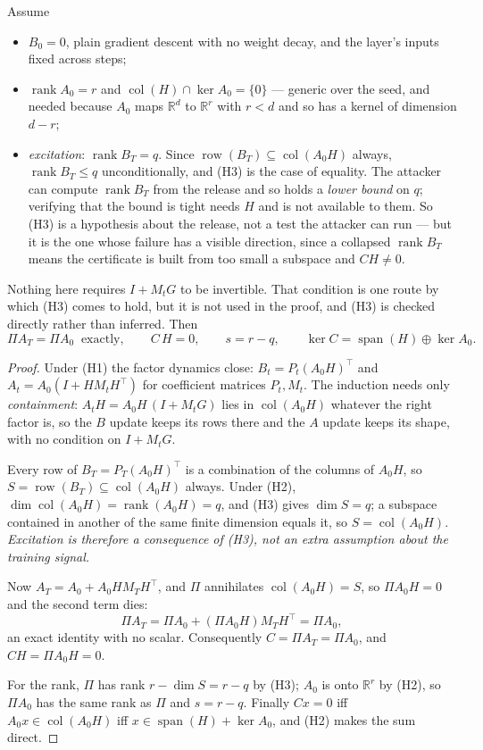 \begin{theorem}\label{thm:cert}
Assume
\begin{itemize}
\item[(H1)] $B_0=0$, plain gradient descent with no weight decay, and the layer's inputs fixed
  across steps;
\item[(H2)] $\operatorname{rank}A_0=r$ and $\operatorname{col}(H)\cap\ker A_0=\{0\}$ --- generic
  over the seed, and needed because $A_0$ maps $\mathbb R^{d}$ to $\mathbb R^{r}$ with $r<d$ and so
  has a kernel of dimension $d-r$;
\item[(H3)] \emph{excitation}: $\operatorname{rank}B_T=q$. Since
  $\operatorname{row}(B_T)\subseteq\operatorname{col}(A_0H)$ always, $\operatorname{rank}B_T\le q$
  unconditionally, and (H3) is the case of equality. The attacker can compute
  $\operatorname{rank}B_T$ from the release and so holds a \emph{lower bound} on $q$; verifying that
  the bound is tight needs $H$ and is not available to them. So (H3) is a hypothesis about the
  release, not a test the attacker can run --- but it is the one whose failure has a visible
  direction, since a collapsed $\operatorname{rank}B_T$ means the certificate is built from too small
  a subspace and $CH\neq0$.
\end{itemize}
Nothing here requires $I+M_tG$ to be invertible. That condition is one route by which (H3) comes to
hold, but it is not used in the proof, and (H3) is checked directly rather than inferred.
Then
\[
  \Pi A_T=\Pi A_0\ \text{ exactly},\qquad
  C\,H=0,\qquad s=r-q,\qquad \ker C=\operatorname{span}(H)\oplus\ker A_0 .
\]
\end{theorem}

\begin{proof}
Under (H1) the factor dynamics close: $B_t=P_t(A_0H)^{\top}$ and $A_t=A_0(I+HM_tH^{\top})$ for
coefficient matrices $P_t,M_t$. The induction needs only \emph{containment}: $A_tH=A_0H\,(I+M_tG)$
lies in $\operatorname{col}(A_0H)$ whatever the right factor is, so the $B$ update keeps its rows
there and the $A$ update keeps its shape, with no condition on $I+M_tG$.

Every row of $B_T=P_T(A_0H)^{\top}$ is a combination of the columns of $A_0H$, so
$S=\operatorname{row}(B_T)\subseteq\operatorname{col}(A_0H)$ always. Under (H2),
$\dim\operatorname{col}(A_0H)=\operatorname{rank}(A_0H)=q$, and (H3) gives $\dim S=q$; a subspace
contained in another of the same finite dimension equals it, so
$S=\operatorname{col}(A_0H)$. \emph{Excitation is therefore a consequence of (H3), not an extra
assumption about the training signal.}

Now $A_T=A_0+A_0HM_TH^{\top}$, and $\Pi$ annihilates $\operatorname{col}(A_0H)=S$, so
$\Pi A_0H=0$ and the second term dies:
\[
  \Pi A_T=\Pi A_0+(\Pi A_0H)M_TH^{\top}=\Pi A_0 ,
\]
an exact identity with no scalar. Consequently $C=\Pi A_T=\Pi A_0$, and
$CH=\Pi A_0H=0$.

For the rank, $\Pi$ has rank $r-\dim S=r-q$ by (H3); $A_0$ is onto $\mathbb R^{r}$ by (H2), so
$\Pi A_0$ has the same rank as $\Pi$ and $s=r-q$. Finally $Cx=0$
iff $A_0x\in\operatorname{col}(A_0H)$ iff $x\in\operatorname{span}(H)+\ker A_0$, and (H2) makes the
sum direct.
\end{proof}

